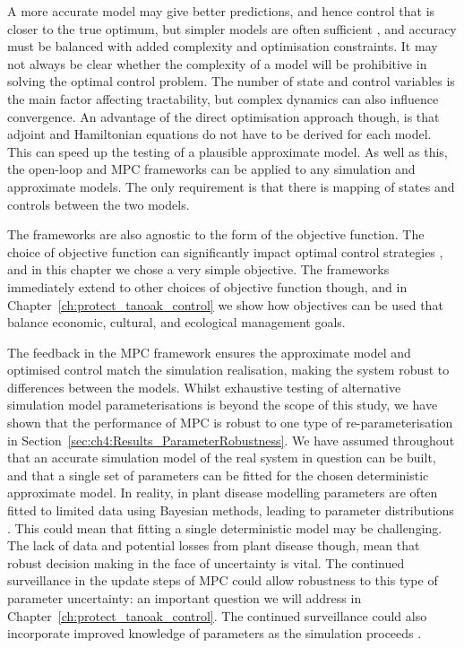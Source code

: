 A more accurate model may give better predictions, and hence control that is closer to the true optimum, but simpler models are often sufficient \citep{thompson_effect_2018}, and accuracy must be balanced with added complexity and optimisation constraints. It may not always be clear whether the complexity of a model will be prohibitive in solving the optimal control problem. The number of state and control variables is the main factor affecting tractability, but complex dynamics can also influence convergence. An advantage of the direct optimisation approach though, is that adjoint and Hamiltonian equations do not have to be derived for each model. This can speed up the testing of a plausible approximate model. As well as this, the open-loop and MPC frameworks can be applied to any simulation and approximate models. The only requirement is that there is mapping of states and controls between the two models. 

The frameworks are also agnostic to the form of the objective function. The choice of objective function can significantly impact optimal control strategies \citep{probert_decision_2016}, and in this chapter we chose a very simple objective. The frameworks immediately extend to other choices of objective function though, and in Chapter~\ref{ch:protect_tanoak_control} we show how objectives can be used that balance economic, cultural, and ecological management goals.

The feedback in the MPC framework ensures the approximate model and optimised control match the simulation realisation, making the system robust to differences between the models. Whilst exhaustive testing of alternative simulation model parameterisations is beyond the scope of this study, we have shown that the performance of MPC is robust to one type of re-parameterisation in Section~\ref{sec:ch4:Results_ParameterRobustness}. We have assumed throughout that an accurate simulation model of the real system in question can be built, and that a single set of parameters can be fitted for the chosen deterministic approximate model. In reality, in plant disease modelling parameters are often fitted to limited data using Bayesian methods, leading to parameter distributions \citep[e.g.][]{kleczkowski_parameter_2007, parry_bayesian_2014}. This could mean that fitting a single deterministic model may be challenging. The lack of data and potential losses from plant disease \citep{savary_global_2019} though, mean that robust decision making in the face of uncertainty is vital. The continued surveillance in the update steps of MPC could allow robustness to this type of parameter uncertainty: an important question we will address in Chapter~\ref{ch:protect_tanoak_control}. The continued surveillance could also incorporate improved knowledge of parameters as the simulation proceeds \citep{thompson_control_2018}.

